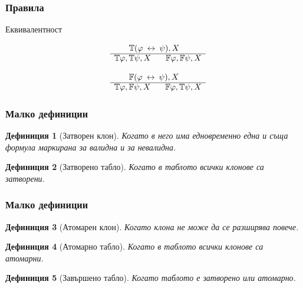 \documentclass{beamer}
\newtheorem{defn}{Дефиниция}[section]
\newcommand{\signT}{\mathbb{T}}
\newcommand{\signF}{\mathbb{F}}
\begin{document}
\begin{frame}\frametitle{Правила}
Еквивалентност
		\noindent\begin{minipage}{.5\linewidth}
		\begin{align*}
			\begin{array}{rl}
				& \:\:\:\:\:\:\:\: \signT(\varphi \: \leftrightarrow \: \psi), X \\
			      \cline{2-2}
			      & \signT\varphi, \signT\psi, X \:\:\:\:\:\:\:\: \signF\varphi, \signF\psi, X
			\end{array}
		\end{align*}
		\end{minipage}%
		\begin{minipage}{.5\linewidth}
		\begin{align*}
			\begin{array}{rl}
				& \:\:\:\:\:\:\:\: \signF(\varphi \: \leftrightarrow \: \psi), X \\
			      \cline{2-2}
			      & \signT\varphi, \signF\psi, X \:\:\:\:\:\:\:\: \signF\varphi, \signT\psi, X
			\end{array}
		\end{align*}
		\end{minipage}
\end{frame}

\begin{frame}\frametitle{Малко дефиниции}

\begin{defn}[Затворен клон]
Когато в него има едновременно една и съща формула маркирана за валидна и за невалидна.
\end{defn}

\begin{defn}[Затворено табло]
Когато в таблото всички клонове са затворени.
\end{defn}
\end{frame}

\begin{frame}\frametitle{Малко дефиниции}
\begin{defn}[Атомарен клон]
Когато клона не може да се разширява повече.
\end{defn}

\begin{defn}[Атомарно табло]
Когато в таблото всички клонове са атомарни.
\end{defn}

\begin{defn}[Завършено табло]
Когато таблото е затворено или атомарно.
\end{defn}
\end{frame}
\end{document}
